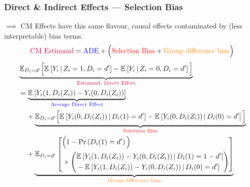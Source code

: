 \documentclass[dvipsnames]{beamer} %
\newcommand{\Prob}[1]{\Pr\left( #1 \right)}                         %
\newcommand{\E}[2][]{\mathbb{E}_{#1} \left[ #2 \right]}                    %
\newcommand{\Egiven}[3][]{\mathbb{E}_{#1} \left[ #2 \, \middle\vert \, #3 \right]} %
\begin{document}
\begin{frame}[noframenumbering]
    \frametitle{Direct \& Indirect Effects --- Selection Bias}
    \label{main:ade-selection-bias}
    $\implies$ CM Effects have this same flavour, causal effects contaminated by (less interpretable) bias terms.
    \hyperlink{cm-model}{}
    \[ \text{\textcolor{purple}{CM Estimand}}
        = \text{\textcolor{blue}{ADE}}
            + \Big(\text{\textcolor{red}{Selection Bias}}
            + \text{\textcolor{orange}{Group difference bias}}\Big) \]
    \vspace{-0.25cm}
    {\footnotesize
    \begin{align*}
        & \underbrace{\mathbb E_{D_i=d'} \Big[
            \Egiven{Y_i}{Z_i = 1, D_i=d'} - \Egiven{Y_i}{Z_i = 0, D_i=d'} \Big]}_{
                \text{\textcolor{purple}{Estimand, Direct Effect}} } \\
        & = \underbrace{\E{Y_i(1, D_i(Z_i)) - Y_i(0, D_i(Z_i))}}_{
            \text{\textcolor{blue}{Average Direct Effect}}} \\
        & \;\;\;\; + \underbrace{ \mathbb E_{D_i=d'} \Big[ 
            \Egiven{Y_i(0, D_i(Z_i))}{D_i(1) = d'} 
            - \Egiven{Y_i(0, D_i(Z_i))}{D_i(0) = d'} \Big] }_{
                \text{\textcolor{red}{Selection Bias}}} \\
        & \;\;\;\; + \underbrace{ \E[D_i =d']{
            \begin{aligned}
            &\Big(1 - \Prob{D_i(1) = d'} \Big) \\
            &\times \left( \begin{aligned}
                &\Egiven{Y_i(1, D_i(Z_i)) - Y_i(0, D_i(Z_i))}{D_i(1) = 1-d'} \\ 
                &  - \Egiven{Y_i(1, D_i(Z_i)) - Y_i(0, D_i(Z_i))}{D_i(0) = d'}
                \end{aligned} \right) \end{aligned}} }_{
                    \text{\textcolor{orange}{Group difference bias}}}
    \end{align*}}
    \hyperlink{group-diff-ade}{}
\end{frame}
\end{document}
